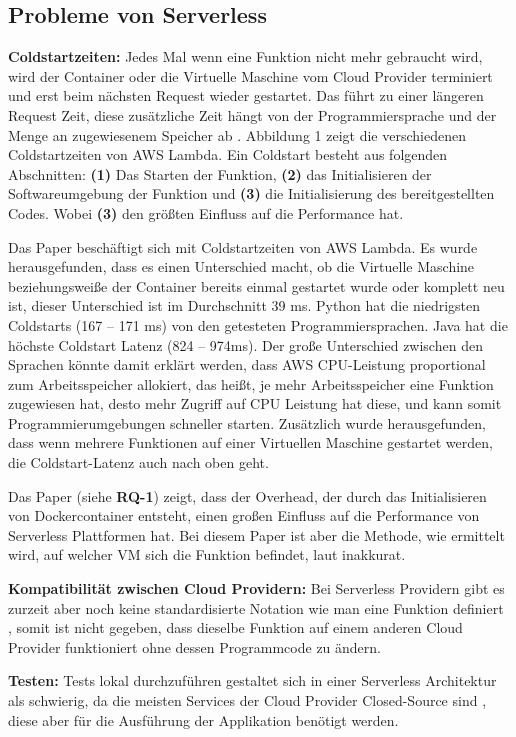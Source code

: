 \subsection{Probleme von Serverless}

\begin{flushleft}
\textbf{Coldstartzeiten:} Jedes Mal wenn eine Funktion nicht mehr gebraucht wird, wird der Container oder die Virtuelle Maschine vom Cloud Provider terminiert und erst beim nächsten Request wieder gestartet. Das führt zu einer längeren Request Zeit, diese zusätzliche Zeit hängt von der Programmiersprache und der Menge an zugewiesenem Speicher ab \autocite[p.~138--139]{Wang}. Abbildung 1 zeigt die verschiedenen Coldstartzeiten von AWS Lambda. Ein Coldstart besteht aus folgenden Abschnitten: \textbf{(1)} Das Starten der Funktion, \textbf{(2)} das Initialisieren der Softwareumgebung der Funktion und \textbf{(3)} die Initialisierung des bereitgestellten Codes. Wobei \textbf{(3)} den größten Einfluss auf die Performance hat.  \autocite[p.~14]{Jonas2019} \break

Das Paper \cite{Wang} beschäftigt sich mit Coldstartzeiten von AWS Lambda. Es wurde herausgefunden, dass es einen Unterschied macht, ob die Virtuelle Maschine beziehungsweiße der Container bereits einmal gestartet wurde oder komplett neu ist, dieser Unterschied ist im Durchschnitt 39 ms. Python hat die niedrigsten Coldstarts (167 – 171 ms) von den getesteten Programmiersprachen. Java hat die höchste Coldstart Latenz (824 – 974ms). Der große Unterschied zwischen den Sprachen könnte damit erklärt werden, dass AWS CPU-Leistung proportional zum Arbeitsspeicher allokiert, das heißt, je mehr Arbeitsspeicher eine Funktion zugewiesen hat, desto mehr Zugriff auf CPU Leistung hat diese, und kann somit Programmierumgebungen schneller starten. Zusätzlich wurde herausgefunden, dass wenn mehrere Funktionen auf einer Virtuellen Maschine gestartet werden, die Coldstart-Latenz auch nach oben geht.

Das Paper \cite{Lloyd} (siehe \textbf{RQ-1}) zeigt, dass der Overhead, der durch das Initialisieren von Dockercontainer entsteht, einen großen Einfluss auf die Performance von Serverless Plattformen hat. Bei diesem Paper ist aber die Methode, wie ermittelt wird, auf welcher VM sich die Funktion befindet, laut \autocite[p.~135 und 137]{Wang} inakkurat.
\break


\textbf{Kompatibilität zwischen Cloud Providern:} Bei Serverless Providern gibt es zurzeit aber noch keine standardisierte Notation wie man eine Funktion definiert \autocite[p.~3]{VanEyk2017}, somit ist nicht gegeben, dass dieselbe Funktion auf einem anderen Cloud Provider funktioniert ohne dessen Programmcode zu ändern. \break


\textbf{Testen:} Tests lokal durchzuführen gestaltet sich in einer Serverless Architektur als schwierig, da die meisten Services der Cloud Provider Closed-Source sind \autocite[p.~3]{VanEyk2017}, diese aber für die Ausführung der Applikation benötigt werden. \break

\end{flushleft}

